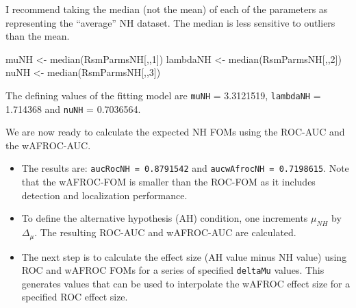 \documentclass[
]{book}
\newenvironment{Shaded}{\begin{snugshade}}{\end{snugshade}}
\newcommand{\AttributeTok}[1]{\textcolor[rgb]{0.77,0.63,0.00}{#1}}
\newcommand{\DecValTok}[1]{\textcolor[rgb]{0.00,0.00,0.81}{#1}}
\newcommand{\FunctionTok}[1]{\textcolor[rgb]{0.00,0.00,0.00}{#1}}
\newcommand{\NormalTok}[1]{#1}
\newcommand{\OtherTok}[1]{\textcolor[rgb]{0.56,0.35,0.01}{#1}}
\newcommand{\SpecialCharTok}[1]{\textcolor[rgb]{0.00,0.00,0.00}{#1}}
\begin{document}
I recommend taking the median (not the mean) of each of the parameters as representing the ``average'' NH dataset. The median is less sensitive to outliers than the mean.

\begin{Shaded}
\begin{Highlighting}[]
\NormalTok{muNH }\OtherTok{\textless{}{-}} \FunctionTok{median}\NormalTok{(RsmParmsNH[,,}\DecValTok{1}\NormalTok{]) }
\NormalTok{lambdaNH }\OtherTok{\textless{}{-}} \FunctionTok{median}\NormalTok{(RsmParmsNH[,,}\DecValTok{2}\NormalTok{])}
\NormalTok{nuNH }\OtherTok{\textless{}{-}} \FunctionTok{median}\NormalTok{(RsmParmsNH[,,}\DecValTok{3}\NormalTok{])}
\end{Highlighting}
\end{Shaded}

The defining values of the fitting model are \texttt{muNH} = 3.3121519, \texttt{lambdaNH} = 1.714368 and \texttt{nuNH} = 0.7036564.

We are now ready to calculate the expected NH FOMs using the ROC-AUC and the wAFROC-AUC.

\begin{Shaded}
\end{Shaded}

\begin{itemize}
\item
  The results are: \texttt{aucRocNH\ =\ 0.8791542} and \texttt{aucwAfrocNH\ =\ 0.7198615}. Note that the wAFROC-FOM is smaller than the ROC-FOM as it includes detection and localization performance.
\item
  To define the alternative hypothesis (AH) condition, one increments \(\mu_{NH}\) by \(\Delta_{\mu}\). The resulting ROC-AUC and wAFROC-AUC are calculated.
\item
  The next step is to calculate the effect size (AH value minus NH value) using ROC and wAFROC FOMs for a series of specified \texttt{deltaMu} values. This generates values that can be used to interpolate the wAFROC effect size for a specified ROC effect size.
\end{itemize}
\end{document}
